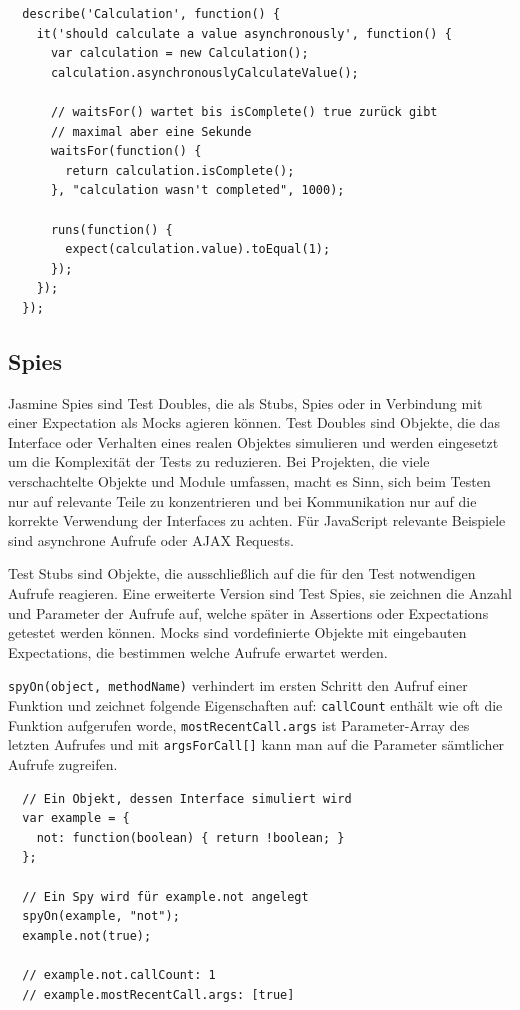 \documentclass[11pt, a4paper]{article}
\begin{document}
\begin{verbatim}
  describe('Calculation', function() {
    it('should calculate a value asynchronously', function() {
      var calculation = new Calculation();
      calculation.asynchronouslyCalculateValue();

      // waitsFor() wartet bis isComplete() true zurück gibt
      // maximal aber eine Sekunde
      waitsFor(function() {
        return calculation.isComplete();
      }, "calculation wasn't completed", 1000);

      runs(function() {
        expect(calculation.value).toEqual(1);
      });
    });
  });
\end{verbatim}

\subsection{Spies}

Jasmine Spies sind Test Doubles\cite{meszaros_test_2011-1}, die als Stubs,
Spies oder in Verbindung mit einer Expectation als Mocks agieren können.
Test Doubles sind Objekte, die das Interface oder Verhalten eines realen
Objektes simulieren und werden eingesetzt um die Komplexität der Tests zu
reduzieren. Bei Projekten, die viele verschachtelte Objekte und Module umfassen,
macht es Sinn, sich beim Testen nur auf relevante Teile zu konzentrieren und bei
Kommunikation nur auf die korrekte Verwendung der Interfaces zu achten. Für
JavaScript relevante Beispiele sind asynchrone Aufrufe oder AJAX Requests.

Test Stubs sind Objekte, die ausschließlich auf die für den Test notwendigen
Aufrufe reagieren. Eine erweiterte Version sind Test Spies, sie zeichnen die
Anzahl und Parameter der Aufrufe auf, welche später in Assertions oder
Expectations getestet werden können. Mocks sind vordefinierte Objekte mit
eingebauten Expectations, die bestimmen welche Aufrufe erwartet werden.

\texttt{spyOn(object, methodName)} verhindert im ersten Schritt den Aufruf einer
Funktion und zeichnet folgende Eigenschaften auf: \texttt{callCount} enthält wie
oft die Funktion aufgerufen worde, \texttt{mostRecentCall.args} ist
Parameter-Array des letzten Aufrufes und mit \texttt{argsForCall[]} kann man auf
die Parameter sämtlicher Aufrufe zugreifen.

\begin{verbatim}
  // Ein Objekt, dessen Interface simuliert wird
  var example = {
    not: function(boolean) { return !boolean; }
  };

  // Ein Spy wird für example.not angelegt
  spyOn(example, "not");
  example.not(true);

  // example.not.callCount: 1
  // example.mostRecentCall.args: [true]
\end{verbatim}
\end{document}
